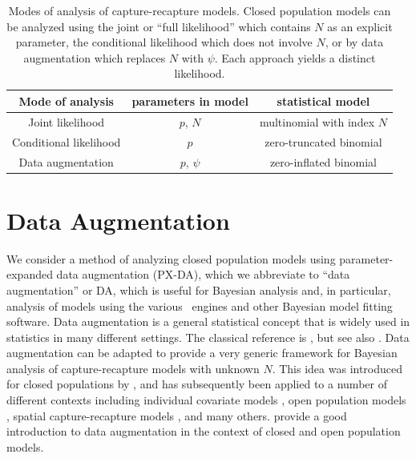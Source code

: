 \begin{table}[ht]
\centering
\caption{Modes of analysis of capture-recapture models. Closed
  population models can be analyzed using the joint or ``full
  likelihood'' which contains $N$ as an explicit parameter, the
  conditional likelihood which does not involve $N$, or by data
  augmentation which replaces $N$ with $\psi$. Each approach yields a
  distinct likelihood.}
\begin{tabular}{ccc}
\hline \hline
Mode of analysis & parameters in model & statistical model \\ \hline
Joint likelihood                &	$p$, $N$	&	multinomial with index $N$\\
Conditional likelihood 		&	$p$	&	zero-truncated binomial \\
Data augmentation		&	$p$, $\psi$	&
zero-inflated binomial\\
\hline
\end{tabular}
\label{tab.3.modes}
\end{table}



\section{Data Augmentation }
\label{closed.sec.da}

We consider a method of analyzing closed population models using
parameter-expanded data augmentation (PX-DA), which we abbreviate to
``data augmentation'' or DA, which is useful for Bayesian analysis
and, in particular, analysis of models using the various \bugs~engines
and other Bayesian model fitting software.  Data augmentation is a
general statistical concept that is widely used in statistics in many
different settings. The classical reference is
\citet{tanner_wong:1987}, but see also \citet{liu_wu:1999}.  Data
augmentation can be adapted to provide a very generic framework for
Bayesian analysis of capture-recapture models with unknown $N$. This
idea was introduced for closed populations by \citet{royle_etal:2007},
and has subsequently been applied to a number of different contexts
including individual covariate models \citep{royle:2009}, open
population models \citep{royle_dorazio:2008,royle_dorazio:2012,
  gardner_etal:2010ecol}, spatial capture-recapture models
\citep{royle_young:2008, royle_etal:2009ecol, gardner_etal:2009}, and many
others. \citet[][Chapts. 6 and 10]{kery_schaub:2011} provide a good
introduction to data augmentation in the context of closed and open population
models.



